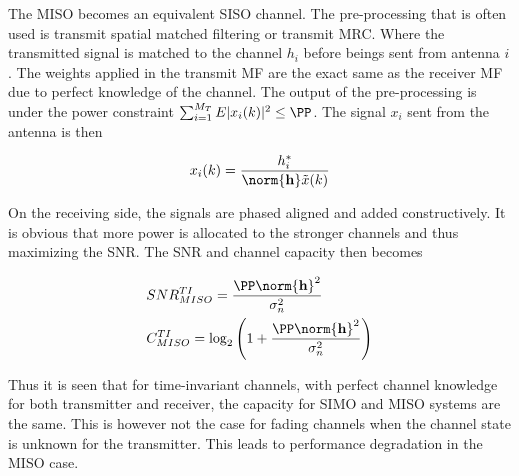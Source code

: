 The MISO becomes an equivalent SISO channel. The pre-processing that is often used is transmit spatial matched filtering or transmit MRC. Where the transmitted signal is matched to the channel $h_i$ before beings sent from antenna $i$. The weights applied in the transmit MF are the exact same as the receiver MF due to perfect knowledge of the channel. The output of the pre-processing is under the power constraint $\sum_{i=1}^{M_T} E|x_i(k)|^2 \leq \PP$. The signal $x_i$ sent from the antenna is then 

\begin{align*}
  x_i(k) = \frac{h_i^*}{\norm{\mathbf{h}} \tilde{x}(k)}
\end{align*}

On the receiving side, the signals are phased aligned and added constructively. It is obvious that more power is allocated to the stronger channels and thus maximizing the SNR. The SNR and channel capacity then becomes 

\begin{align*}
&SNR^{TI}_{MISO} = \frac{\PP \norm{\mathbf{h}}^2}{\sigma^2_n} \\
&C^{TI}_{MISO} = \log_2 \left( 1+\frac{\PP \norm{\mathbf{h}}^2}{\sigma^2_n} \right)  
\end{align*}

Thus it is seen that for time-invariant channels, with perfect channel knowledge for both transmitter and receiver, the capacity for SIMO and MISO systems are the same. This is however not the case for fading channels when the channel state is unknown for the transmitter. This leads to performance degradation in the MISO case. 


